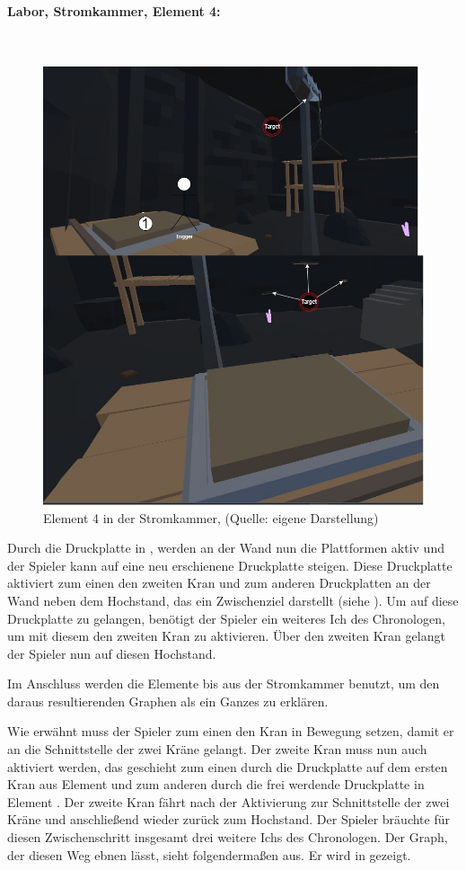\paragraph{Labor, Stromkammer, Element 4:}\label{p:lse4}
~
\begin{figure}[ht]
\centering
\includegraphics[width=0.6\linewidth]{content/pictures/Raetsel-L02_R01_R04.jpg}
\caption{Element 4 in der Stromkammer, (Quelle: eigene Darstellung)}
\label{fig:L02_R01_R04}
\end{figure}

Durch die Druckplatte in , werden an der Wand nun die Plattformen aktiv und der Spieler kann auf eine neu erschienene Druckplatte steigen. Diese Druckplatte aktiviert zum einen den zweiten Kran und zum anderen Druckplatten an der Wand neben dem Hochstand, das ein Zwischenziel darstellt (siehe ). Um auf diese Druckplatte zu gelangen, benötigt der Spieler ein weiteres Ich des Chronologen, um mit diesem den zweiten Kran zu aktivieren. Über den zweiten Kran gelangt der Spieler nun auf diesen Hochstand.

Im Anschluss werden die Elemente  bis  aus der Stromkammer benutzt, um den daraus resultierenden Graphen als ein Ganzes zu erklären.

Wie erwähnt muss der Spieler zum einen den Kran in Bewegung setzen, damit er an die Schnittstelle der zwei Kräne gelangt. Der zweite Kran muss nun auch aktiviert werden, das geschieht zum einen durch die Druckplatte auf dem ersten Kran aus Element  und zum anderen durch die frei werdende Druckplatte in Element . Der zweite Kran fährt nach der Aktivierung zur Schnittstelle der zwei Kräne und anschließend wieder zurück zum Hochstand. Der Spieler bräuchte für diesen Zwischenschritt insgesamt drei weitere Ichs des Chronologen. Der Graph, der diesen Weg ebnen lässt, sieht folgendermaßen aus. Er wird in  gezeigt.

